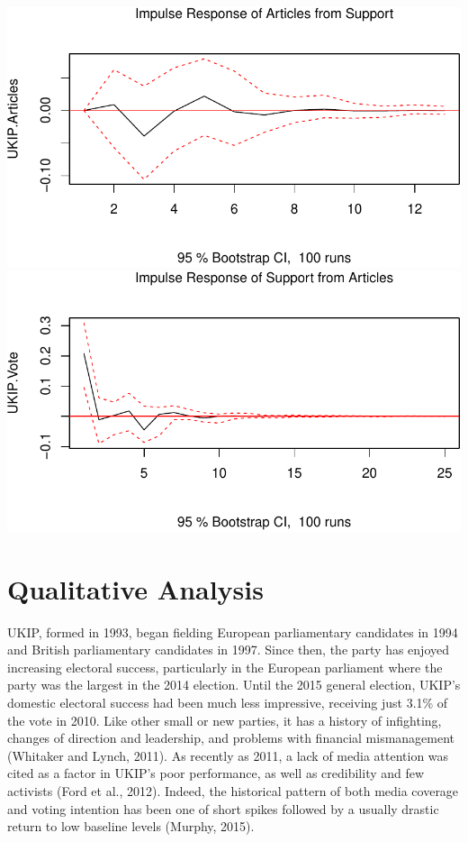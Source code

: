 \documentclass[12pt,article]{article}
\begin{document}
\includegraphics{ukip_media_files/figure-latex/unnamed-chunk-6-1.pdf}
\includegraphics{ukip_media_files/figure-latex/unnamed-chunk-6-2.pdf}

\section{Qualitative Analysis}\label{qualitative-analysis}

UKIP, formed in 1993, began fielding European parliamentary candidates
in 1994 and British parliamentary candidates in 1997. Since then, the
party has enjoyed increasing electoral success, particularly in the
European parliament where the party was the largest in the 2014
election. Until the 2015 general election, UKIP's domestic electoral
success had been much less impressive, receiving just 3.1\% of the vote
in 2010. Like other small or new parties, it has a history of
infighting, changes of direction and leadership, and problems with
financial mismanagement (Whitaker and Lynch, 2011). As recently as 2011,
a lack of media attention was cited as a factor in UKIP's poor
performance, as well as credibility and few activists (Ford et al.,
2012). Indeed, the historical pattern of both media coverage and voting
intention has been one of short spikes followed by a usually drastic
return to low baseline levels (Murphy, 2015).
\end{document}
